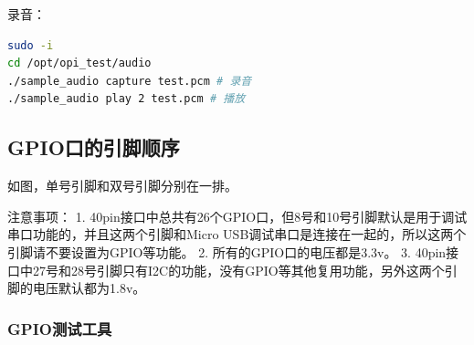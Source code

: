 录音：

\begin{lstlisting}[language=bash]
sudo -i
cd /opt/opi_test/audio
./sample_audio capture test.pcm # 录音
./sample_audio play 2 test.pcm # 播放
\end{lstlisting}

\subsection{GPIO口的引脚顺序}\label{gpioux53e3ux7684ux5f15ux811aux987aux5e8f}

如图，单号引脚和双号引脚分别在一排。

注意事项： 1.
40pin接口中总共有26个GPIO口，但8号和10号引脚默认是用于调试串口功能的，并且这两个引脚和Micro
USB调试串口是连接在一起的，所以这两个引脚请不要设置为GPIO等功能。 2.
所有的GPIO口的电压都是3.3v。 3.
40pin接口中27号和28号引脚只有I2C的功能，没有GPIO等其他复用功能，另外这两个引脚的电压默认都为1.8v。

\subsubsection{GPIO测试工具}\label{gpioux6d4bux8bd5ux5de5ux5177}

